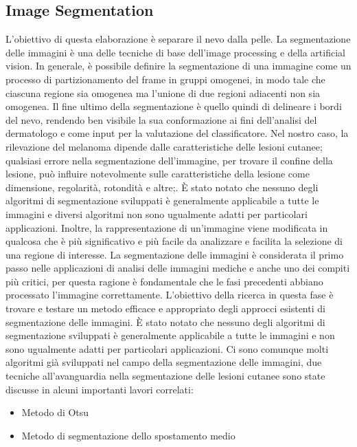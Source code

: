 {\subsection{Image Segmentation}
L'obiettivo di questa elaborazione è separare il nevo dalla pelle.
\newline
La segmentazione delle immagini è una delle tecniche di base dell'image processing e della artificial vision. 
In generale, è possibile definire la segmentazione di una immagine come un processo di partizionamento del frame in gruppi omogenei, in modo tale che ciascuna regione sia omogenea ma l'unione di due regioni adiacenti non sia omogenea. \cite{haralick1985image}
\newline
Il fine ultimo della segmentazione è quello quindi di delineare i bordi del nevo, rendendo ben visibile la sua conformazione ai fini dell'analisi del dermatologo e come input per la valutazione del classificatore.  \cite{schaefer2011colour}
\newline
Nel nostro caso, la rilevazione del melanoma dipende dalle caratteristiche delle lesioni cutanee; qualsiasi errore nella segmentazione dell'immagine, per trovare il confine della lesione, può influire notevolmente sulle caratteristiche della lesione come dimensione, regolarità, rotondità e altre;.
\newline
È stato notato che nessuno degli algoritmi di segmentazione sviluppati è generalmente applicabile a tutte le immagini e diversi algoritmi non sono ugualmente adatti per particolari applicazioni.
\newline
Inoltre, la rappresentazione di un'immagine viene modificata in qualcosa che è più significativo e più facile da analizzare e facilita la selezione di una regione di interesse.
La segmentazione delle immagini è considerata il primo passo nelle applicazioni di analisi delle immagini mediche e anche uno dei compiti più critici, per questa ragione è fondamentale che le fasi precedenti abbiano processato l'immagine correttamente.
\newline
L'obiettivo della ricerca in questa fase è trovare e testare un metodo efficace e appropriato degli approcci esistenti di segmentazione delle immagini.
\newline
È stato notato che nessuno degli algoritmi di segmentazione sviluppati è generalmente applicabile a tutte le immagini e non sono ugualmente adatti per particolari applicazioni. 
\newline
Ci sono comunque molti algoritmi già sviluppati nel campo della segmentazione delle immagini, due tecniche all'avanguardia nella segmentazione delle lesioni cutanee sono state discusse in alcuni importanti lavori correlati:
\begin{itemize}
	\item Metodo di Otsu
	\item Metodo di segmentazione dello spostamento medio
\end{itemize}
\newpage
}
